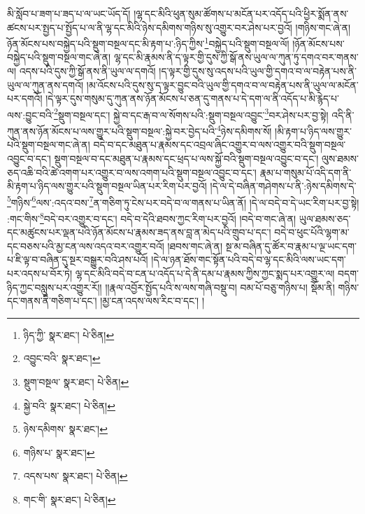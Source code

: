 མི་སློབ་པ་ཟག་པ་ཟད་པ་ལ་ཡང་ཡོད་དོ། །ལྷ་དང་མིའི་ཕུན་སུམ་ཚོགས་པ་མངོན་པར་འདོད་པའི་ཕྱིར་སྨོན་ནས་ཚངས་པར་སྤྱད་པ་སྤྱོད་པ་ལ་ནི་ལྷ་དང་མིའི་ཉེས་དམིགས་གཉིས་སུ་འགྱུར་བར་ཤེས་པར་བྱའོ། །གཉིས་གང་ཞེ་ན། ཉོན་མོངས་པས་བསྐྱེད་པའི་སྡུག་བསྔལ་དང་མི་རྟག་པ་:ཉིད་ཀྱིས་\footnote{ཉིད་ཀྱི་  སྣར་ཐང་།  པེ་ཅིན། }བསྐྱེད་པའི་སྡུག་བསྔལ་ལོ། །ཉོན་མོངས་པས་བསྐྱེད་པའི་སྡུག་བསྔལ་གང་ཞེ་ན། ལྷ་དང་མི་རྣམས་ནི་ད་ལྟར་གྱི་དུས་ཀྱི་སྒོ་ནས་ཡུལ་ལ་ཀུན་ཏུ་དགའ་བར་གནས་ལ། འདས་པའི་དུས་ཀྱི་སྒོ་ནས་ནི་ཡུལ་ལ་དགའོ། །ད་ལྟར་གྱི་དུས་སུ་འདས་པའི་ཡུལ་གྱི་དགའ་བ་ལ་བརྟེན་པས་ནི་ཡུལ་ལ་ཀུན་ནས་དགའོ། །མ་འོངས་པའི་དུས་སུ་ད་ལྟར་བྱུང་བའི་ཡུལ་གྱི་དགའ་བ་ལ་བརྟེན་པས་ནི་ཡུལ་ལ་མངོན་པར་དགའོ། །དེ་ལྟར་དུས་གསུམ་དུ་ཀུན་ནས་ཉོན་མོངས་པ་ཅན་དུ་གནས་པ་དེ་དག་ལ་ནི་འདོད་པ་མི་རྙེད་པ་ལས་:བྱུང་བའི་\footnote{འབྱུང་བའི་  སྣར་ཐང་། }སྡུག་བསྔལ་དང་། སྐྱེ་བ་དང་རྒ་བ་ལ་སོགས་པའི་:སྡུག་བསྔལ་འབྱུང་\footnote{སྡུག་བསྔལ་  སྣར་ཐང་།  པེ་ཅིན། }བར་ཤེས་པར་བྱ་སྟེ། འདི་ནི་ཀུན་ནས་ཉོན་མོངས་པ་ལས་གྱུར་པའི་སྡུག་བསྔལ་:སྐྱེ་བར་བྱེད་པའི་\footnote{སྐྱེ་བའི་  སྣར་ཐང་།  པེ་ཅིན། }ཉེས་དམིགས་སོ། །མི་རྟག་པ་ཉིད་ལས་གྱུར་པའི་སྡུག་བསྔལ་གང་ཞེ་ན། བདེ་བ་དང་མཐུན་པ་རྣམས་དང་འབྲལ་ཞིང་འགྱུར་བ་ལས་འགྱུར་བའི་སྡུག་བསྔལ་འབྱུང་བ་དང་། སྡུག་བསྔལ་བ་དང་མཐུན་པ་རྣམས་དང་ཕྲད་པ་ལས་སྐྱོ་བའི་སྡུག་བསྔལ་འབྱུང་བ་དང་། ལུས་ཐམས་ཅད་འཆི་བའི་ཚེ་འགག་པར་འགྱུར་བ་ལས་འགག་པའི་སྡུག་བསྔལ་འབྱུང་བ་དང་། རྣམ་པ་གསུམ་པོ་འདི་དག་ནི་མི་རྟག་པ་ཉིད་ལས་གྱུར་པའི་སྡུག་བསྔལ་ཡིན་པར་རིག་པར་བྱའོ། །དེ་ལ་དེ་བཞིན་གཤེགས་པ་ནི་:ཉེས་དམིགས་དེ་\footnote{ཉེས་དམིགས་  སྣར་ཐང་། }གཉིས་\footnote{གཉིས་པ་  སྣར་ཐང་། }ལས་:འདའ་བས་\footnote{འདས་པས་  སྣར་ཐང་།  པེ་ཅིན། }ན་གཅིག་ཏུ་ངེས་པར་བདེ་བ་ལ་གནས་པ་ཡིན་ནོ། །དེ་ལ་བདེ་བ་དེ་ཡང་རིག་པར་བྱ་སྟེ། :གང་གིས་\footnote{གང་གི་  སྣར་ཐང་།  པེ་ཅིན། }བདེ་བར་འགྱུར་བ་དང་། བདེ་བ་དེའི་ཐབས་ཀྱང་རིག་པར་བྱའོ། །བདེ་བ་གང་ཞེ་ན། ཡུལ་ཐམས་ཅད་དང་མཚུངས་པར་ལྡན་པའི་ཉོན་མོངས་པ་རྣམས་ཟད་ནས་བླ་ན་མེད་པའི་གྲུབ་པ་དང་། བདེ་བ་ཕུང་པོའི་ལྷག་མ་དང་བཅས་པའི་མྱ་ངན་ལས་འདའ་བར་འགྱུར་བའོ། །ཐབས་གང་ཞེ་ན། སྔ་མ་བཞིན་དུ་ཚོར་བ་རྣམ་པ་ལྔ་ཡང་དག་པ་ཇི་ལྟ་བ་བཞིན་དུ་སྔར་བསྒྱུར་བའི་ཤས་པའོ། །དེ་ལ་ཉན་ཐོས་གང་སྟོན་པའི་བདེ་བ་ལྷ་དང་མིའི་ལས་ཡང་དག་པར་འདས་པ་བོར་ཏེ། ལྷ་དང་མིའི་བདེ་བ་ངན་པ་འདོད་པ་དེ་ནི་དམ་པ་རྣམས་ཀྱིས་ཀྱང་སྨད་པར་འགྱུར་ལ། བདག་ཉིད་ཀྱང་བསླུས་པར་འགྱུར་རོ།། །།རྣལ་འབྱོར་སྤྱོད་པའི་ས་ལས་གཞི་བསྡུ་བ། བམ་པོ་བཅུ་གཉིས་པ། སྡོམ་ནི། གཉིས་དང་གནས་ནི་གཅིག་པ་དང་། །མྱ་ངན་འདས་ལས་རིང་བ་དང་། །

